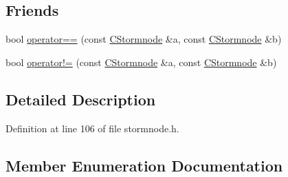\subsection*{Friends}
\begin{DoxyCompactItemize}
\item 
bool \hyperlink{class_c_stormnode_a121484799f6f30f52d4c867ea52a6bca}{operator==} (const \hyperlink{class_c_stormnode}{C\+Stormnode} \&a, const \hyperlink{class_c_stormnode}{C\+Stormnode} \&b)
\item 
bool \hyperlink{class_c_stormnode_ab037406f267a8477e18d96d04b6080f1}{operator!=} (const \hyperlink{class_c_stormnode}{C\+Stormnode} \&a, const \hyperlink{class_c_stormnode}{C\+Stormnode} \&b)
\end{DoxyCompactItemize}


\subsection{Detailed Description}


Definition at line 106 of file stormnode.\+h.



\subsection{Member Enumeration Documentation}
\hypertarget{class_c_stormnode_a8c9a83b0ce70988102d71ecfabe99aa0}{}
